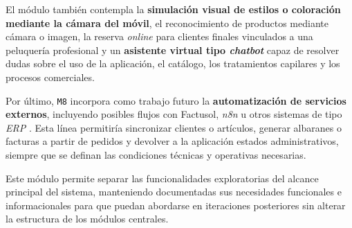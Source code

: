 El módulo también contempla la \textbf{simulación visual de estilos o coloración mediante la cámara del móvil}, el reconocimiento de productos mediante cámara o imagen, la reserva \textit{online} para clientes finales vinculados a una peluquería profesional y un \textbf{asistente virtual tipo \textit{chatbot}} capaz de resolver dudas sobre el uso de la aplicación, el catálogo, los tratamientos capilares y los procesos comerciales.

Por último, \texttt{M8} incorpora como trabajo futuro la \textbf{automatización de servicios externos}, incluyendo posibles flujos con Factusol, \textit{n8n} u otros sistemas de tipo \textit{ERP} \citep{sdelsol-factusol,n8n-webhook,n8n-http-request}. Esta línea permitiría sincronizar clientes o artículos, generar albaranes o facturas a partir de pedidos y devolver a la aplicación estados administrativos, siempre que se definan las condiciones técnicas y operativas necesarias.

Este módulo permite separar las funcionalidades exploratorias del alcance principal del sistema, manteniendo documentadas sus necesidades funcionales e informacionales para que puedan abordarse en iteraciones posteriores sin alterar la estructura de los módulos centrales.
